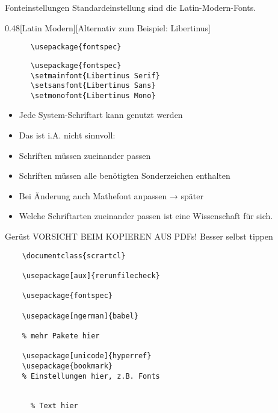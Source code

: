 \begin{frame}[fragile]{
  Fonteinstellungen
  \hfill
}
  Standardeinstellung sind die Latin-Modern-Fonts.
  \vspace{1em}
  \begin{CodeExplanation}{0.48}[Latin Modern][Alternativ zum Beispiel: Libertinus]
    \begin{lstlisting}
      \usepackage{fontspec}
    \end{lstlisting}
  \Explanation
    \begin{lstlisting}
      \usepackage{fontspec}
      \setmainfont{Libertinus Serif}
      \setsansfont{Libertinus Sans}
      \setmonofont{Libertinus Mono}
    \end{lstlisting}
  \end{CodeExplanation}
  \begin{itemize}
    \item Jede System-Schriftart kann genutzt werden
    \item \alert{Das ist i.A. nicht sinnvoll: }
    \item Schriften müssen zueinander passen
    \item Schriften müssen alle benötigten Sonderzeichen enthalten
    \item Bei Änderung auch Mathefont anpassen → später
    \item Welche Schriftarten zueinander passen ist eine Wissenschaft für sich.
  \end{itemize}
\end{frame}

\begin{frame}[fragile]{Gerüst}
  \alert{VORSICHT BEIM KOPIEREN AUS PDFs! Besser selbst tippen}

  \begin{lstlisting}
    \documentclass{scrartcl}

    \usepackage[aux]{rerunfilecheck}

    \usepackage{fontspec}

    \usepackage[ngerman]{babel}

    % mehr Pakete hier

    \usepackage[unicode]{hyperref}
    \usepackage{bookmark}
    % Einstellungen hier, z.B. Fonts

    
      % Text hier
    
  \end{lstlisting}
\end{frame}


